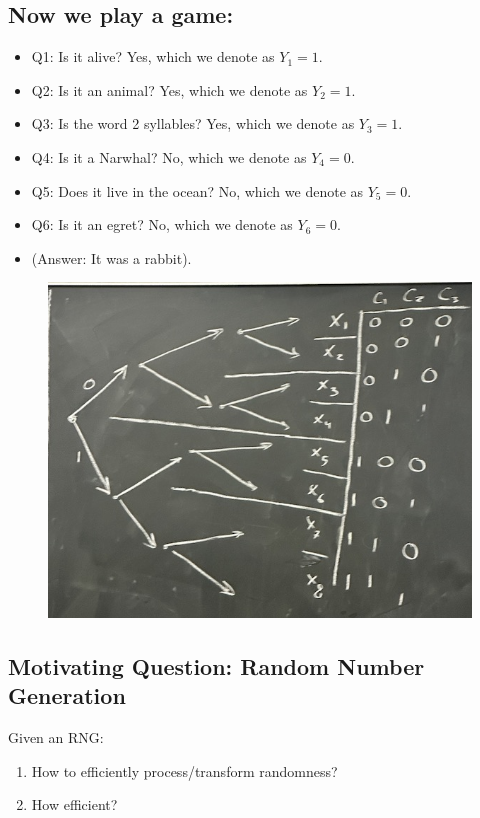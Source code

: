 \subsection{Now we play a game:}
\begin{itemize}
    \item Q1: Is it alive? Yes, which we denote as \(Y_1 = 1\).
    \item Q2: Is it an animal? Yes, which we denote as \(Y_2 = 1\).
    \item Q3: Is the word 2 syllables? Yes, which we denote as \(Y_3 = 1\).
    \item Q4: Is it a Narwhal? No, which we denote as \(Y_4 = 0\).
    \item Q5: Does it live in the ocean? No, which we denote as \(Y_5 = 0\).
    \item Q6: Is it an egret? No, which we denote as \(Y_6 = 0\).
    \item (Answer: It was a rabbit).
\end{itemize}

\begin{figure}[H]
    \centering
    \includegraphics[scale=0.8]{lectures/wk3/img/binary_tree.jpeg}
\end{figure}

\subsection{Motivating Question: Random Number Generation}
Given an RNG:
\begin{enumerate}
    \item How to efficiently process/transform randomness?
    \item How efficient?
\end{enumerate}


